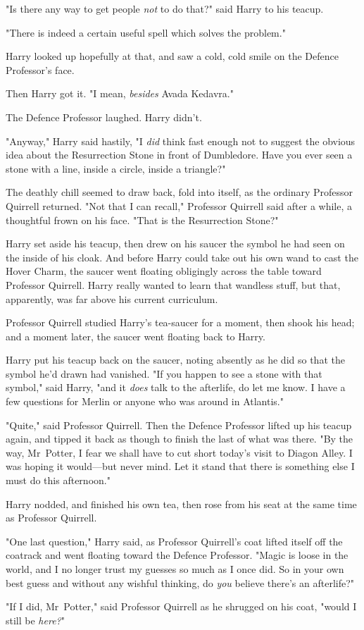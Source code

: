 "Is there any way to get people \emph{not} to do that?" said Harry to his
teacup.

"There is indeed a certain useful spell which solves the problem."

Harry looked up hopefully at that, and saw a cold, cold smile on the Defence
Professor's face.

Then Harry got it. "I mean, \emph{besides} Avada Kedavra."

The Defence Professor laughed. Harry didn't.

"Anyway," Harry said hastily, "I \emph{did} think fast enough not to suggest
the obvious idea about the Resurrection Stone in front of Dumbledore. Have you
ever seen a stone with a line, inside a circle, inside a triangle?"

The deathly chill seemed to draw back, fold into itself, as the ordinary
Professor Quirrell returned. "Not that I can recall," Professor Quirrell said
after a while, a thoughtful frown on his face. "That is the Resurrection Stone?"

Harry set aside his teacup, then drew on his saucer the symbol he had seen on
the inside of his cloak. And before Harry could take out his own wand to cast
the Hover Charm, the saucer went floating obligingly across the table toward
Professor Quirrell. Harry really wanted to learn that wandless stuff, but that,
apparently, was far above his current curriculum.

Professor Quirrell studied Harry's tea-saucer for a moment, then shook his
head; and a moment later, the saucer went floating back to Harry.

Harry put his teacup back on the saucer, noting absently as he did so that the
symbol he'd drawn had vanished. "If you happen to see a stone with that
symbol," said Harry, "and it \emph{does} talk to the afterlife, do let me know.
I have a few questions for Merlin or anyone who was around in Atlantis."

"Quite," said Professor Quirrell. Then the Defence Professor lifted up his
teacup again, and tipped it back as though to finish the last of what was
there. "By the way, Mr~Potter, I fear we shall have to cut short today's visit
to Diagon Alley. I was hoping it would---but never mind. Let it stand that
there is something else I must do this afternoon."

Harry nodded, and finished his own tea, then rose from his seat at the same
time as Professor Quirrell.

"One last question," Harry said, as Professor Quirrell's coat lifted itself off
the coatrack and went floating toward the Defence Professor. "Magic is loose in
the world, and I no longer trust my guesses so much as I once did. So in your
own best guess and without any wishful thinking, do \emph{you} believe there's
an afterlife?"

"If I did, Mr~Potter," said Professor Quirrell as he shrugged on his coat,
"would I still be \emph{here?}"
